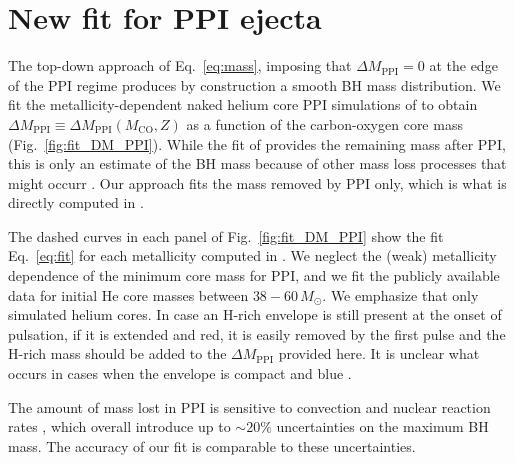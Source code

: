 \documentclass[twocolumn]{aastex63}
\DeclareRobustCommand{\Eqref}[1]{Eq.~\ref{#1}}
\DeclareRobustCommand{\Figref}[1]{Fig.~\ref{#1}}
\begin{document}
\section{New fit for PPI ejecta}

The top-down approach of \Eqref{eq:mass}, imposing that
$\Delta M_\mathrm{PPI}=0$ at the edge of the PPI regime
produces by construction a smooth BH mass
distribution. We fit the metallicity-dependent naked helium core PPI
simulations of \cite{farmer:19} to obtain
$\Delta M_\mathrm{PPI} \equiv \Delta M_\mathrm{PPI}(M_\mathrm{CO},Z)$ as
a function of the carbon-oxygen core mass (\Figref{fig:fit_DM_PPI}). While the fit of
\cite{farmer:19} provides the remaining mass after PPI, this is only
an estimate of the BH mass because of other mass loss processes that
might occurr \citep[e.g.,][]{renzo:20csm, powell:21, rahman:22}. Our approach
fits the mass removed by PPI only, which is what is directly computed
in \cite{farmer:19}.


The dashed curves in each panel of \Figref{fig:fit_DM_PPI} show the
fit \Eqref{eq:fit} for each metallicity computed in
\cite{farmer:19}. We neglect the (weak) metallicity dependence of the
minimum core mass for PPI, and we fit the publicly available data for initial He core
masses between $38-60\,M_\odot$.  We emphasize that \cite{farmer:19}
only simulated helium cores. In case an H-rich envelope is still
present at the onset of pulsation, if it is extended and red, it
is easily removed by the first pulse \citep[][]{woosley:17,renzo:20csm} and the H-rich mass should be added to the
$\Delta M_\mathrm{PPI}$ provided here. It is unclear what occurs in
cases when the envelope is compact and blue \cite{dicarlo:19, renzo:20merger, costa:21}.

The amount of mass lost in PPI is sensitive to convection
\cite{renzo:20conv} and nuclear reaction rates \cite{farmer:19,
  farmer:20, costa:21, woosley:21, mehta:21}, which overall introduce
up to $\sim{}20\%$ uncertainties on the maximum BH mass. The accuracy
of our fit is comparable to these uncertainties.
\newpage

\end{document}
